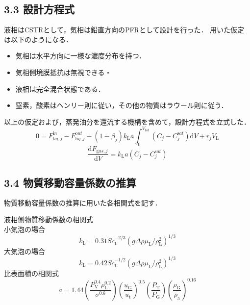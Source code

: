\documentclass[a4j, titlepage]{jsarticle}
\newcommand{\diff}{\mathrm{d}}
\begin{document}
\subsection*{3.3 設計方程式}
液相はCSTRとして，気相は鉛直方向のPFRとして設計を行った．
用いた仮定は以下のようになる．
\begin{itemize}
    \item 気相は水平方向に一様な濃度分布を持つ．\\
    \item 気相側境膜抵抗は無視できる・\\
    \item 液相は完全混合状態である．\\
    \item 窒素，酸素はヘンリー則に従い，その他の物質はラウール則に従う．
\end{itemize}
以上の仮定および，蒸発油分を還流する機構を含めて，設計方程式を立式した．\\
\begin{equation*}
    0 = F^{{\mathrm in}}_{{\mathrm liq},j}-F^{{\mathrm out}}_{{\mathrm liq},j} -(1-\beta_j) k_{{\mathrm L}}a
    \int^{V_{{\mathrm tot}}}_0(C_j - C^{{\mathrm sat}}_j) \diff V + r_j V_{{\mathrm L}}
\end{equation*}
\begin{equation*}
    \frac{ \diff F_{{\mathrm gas},j}}{\diff V} = k_{{\mathrm L}}a(C_j - C^{{\mathrm sat}}_j)
\end{equation*}

\subsection*{3.4 物質移動容量係数の推算}
物質移動容量係数の推算に用いた各相関式を記す．

液相側物質移動係数の相関式\\
小気泡の場合
\begin{equation}
    k_{{\mathrm L}} = 0.31Sc_{{\mathrm L}}^{-2/3}(g \Delta \rho \mu_{{\mathrm L}}/\rho_{{\mathrm L}}^2)^{1/3}
\end{equation}
大気泡の場合
\begin{equation}
    k_{{\mathrm L}} = 0.42Sc_{{\mathrm L}}^{-1/2}(g \Delta \rho \mu_{{\mathrm L}}/\rho_{{\mathrm L}}^2)^{1/3}
\end{equation}
比表面積の相関式
\begin{equation}
    a = 1.44 \left( \frac{P_{{\mathrm V}}^{0.4} \rho_{{\mathrm L}}^{0.2} }{ \sigma^{0.6}} \right) \left( \frac{u_{{\mathrm G}}}{u_{{\mathrm t}}} \right)^{0.5} \left( \frac{P_{{\mathrm T}}}{P_{{\mathrm G}}} \right) \left( \frac{\rho_{{\mathrm G}}}{\rho_{{\mathrm a}}} \right)^{0.16}
\end{equation}
\end{document}
